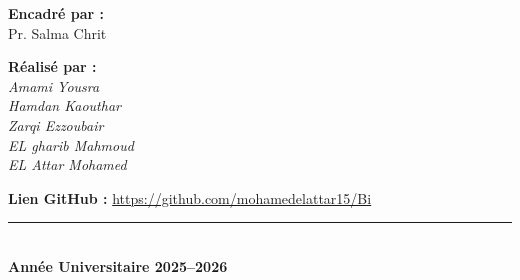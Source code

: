 \documentclass[12pt,a4paper,twoside]{report}
\begin{document}
\begin{titlepage}
  \vspace{0.45cm}

  \begin{tcolorbox}[
    colback=LightGray,
    colframe=MidGray!45,
    width=\linewidth,
    arc=4pt,
    boxrule=0.6pt,
    left=12pt,
    right=12pt,
    top=8pt,
    bottom=8pt
  ]
    \noindent
    \begin{minipage}[t]{0.48\linewidth}
      \textbf{\textcolor{PrimaryRed}{Encadré par :}}\\[0.15cm]
      Pr. Salma Chrit
    \end{minipage}
    \hfill
    \begin{minipage}[t]{0.48\linewidth}
      \raggedleft
      \textbf{\textcolor{PrimaryRed}{Réalisé par :}}\\[0.15cm]
      \textit{Amami Yousra}\\
      \textit{Hamdan Kaouthar}\\
      \textit{Zarqi Ezzoubair}\\
      \textit{EL gharib Mahmoud}\\
      \textit{EL Attar Mohamed}
    \end{minipage}
  \end{tcolorbox}

  \vspace{0.15cm}
  \noindent
  \textbf{\textcolor{PrimaryRed}{Lien GitHub :}} \href{https://github.com/mohamedelattar15/Bi}{https://github.com/mohamedelattar15/Bi}

  \vspace{0.35cm}

  \begin{center}
    \textcolor{PrimaryRed}{\rule{0.45\linewidth}{0.8pt}}\\[0.25cm]
    {\large\bfseries Année Universitaire 2025--2026}
  \end{center}
\end{titlepage}

\newpage
{}
\setcounter{page}{1}

\tableofcontents
\newpage

\listoffigures
\newpage

\listoftables
\newpage

\setcounter{page}{1}
\end{document}
